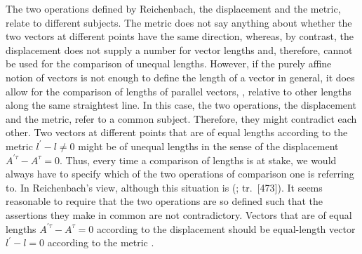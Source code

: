 \documentclass[submitted]{article}
\renewcommand{\rzlap}[2]{(\cite[#1]{Reichenbach1928}; tr.\ [#2])\xspace}
\begin{document}
The two operations defined by Reichenbach, the displacement and the metric, relate to different subjects. The metric does not say anything about whether the two vectors at different points have the same direction, whereas, by contrast, the displacement does not supply a number for vector lengths and, therefore, cannot be used for the comparison of unequal lengths. However, if the purely affine notion of vectors is not enough to define the length of a vector in general, it does allow for the comparison of lengths of parallel vectors, \ie, relative to other lengths along the same straightest line. In this case, the two operations, the displacement and the metric, refer to a common subject. Therefore, they might contradict each other. Two vectors at different points that are of equal lengths according to the metric $l^{\prime}-l \neq 0$ might be of unequal lengths in the sense of the displacement $A^{\prime \tau}-A^{\tau}=0$. Thus, every time a comparison of lengths is at stake, we would always have to specify which of the two operations of comparison one is referring to. In Reichenbach's view, although this situation is  \rzlap{339}{473}. It seems reasonable to require that the two operations are so defined such that the assertions they make in common are not contradictory. Vectors that are of equal lengths $A^{\prime \tau}-A^{\tau}=0$ according to the displacement should be equal-length vector $l^{\prime}-l = 0$ according to the metric .
\end{document}
